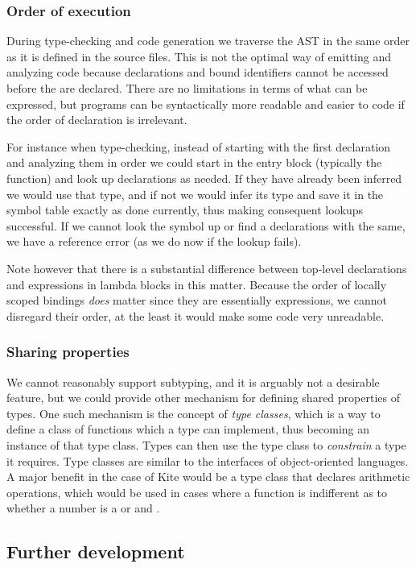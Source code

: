 \subsubsection{Order of execution}
During type-checking and code generation we traverse the AST in the same order as it is defined in the source files. This is not the optimal way of emitting and analyzing code because declarations and bound identifiers cannot be accessed before the are declared. There are no limitations in terms of what can be expressed, but programs can be syntactically more readable and easier to code if the order of declaration is irrelevant.

For instance when type-checking, instead of starting with the first declaration and analyzing them in order we could start in the entry block (typically the  function) and look up declarations as needed. If they have already been inferred we would use that type, and if not we would infer its type and save it in the symbol table exactly as done currently, thus making consequent lookups successful. If we cannot look the symbol up or find a declarations with the same, we have a reference error (as we do now if the lookup fails).

Note however that there is a substantial difference between top-level declarations and expressions in lambda blocks in this matter. Because the order of locally scoped bindings \emph{does} matter since they are essentially  expressions, we cannot disregard their order, at the least it would make some code very unreadable.

\subsubsection{Sharing properties}
We cannot reasonably support subtyping, and it is arguably not a desirable feature, but we could provide other mechanism for defining shared properties of types. One such mechanism is the concept of \emph{type classes}, which is a way to define a class of functions which a type can implement, thus becoming an instance of that type class. Types can then use the type class to \emph{constrain} a type it requires. Type classes are similar to the interfaces of object-oriented languages. A major benefit in the case of Kite would be a  type class that declares arithmetic operations, which would be used in cases where a function is indifferent as to whether a number is a  or and .

\subsection{Further development}


